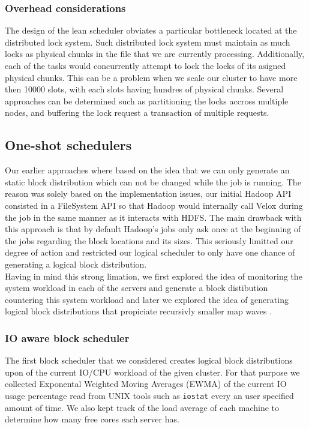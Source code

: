 \subsubsection{Overhead considerations}
The design of the lean scheduler obviates a particular bottleneck located at the distributed lock system. Such distributed lock system must maintain as much locks as physical chunks in the file that 
we are currently processing. Additionally, each of the tasks would concurrently attempt to lock the locks of its asigned physical chunks. This can be a problem when we scale our cluster to have more then 10000 slots, with each slots having hundres of physical chunks. Several approaches can be determined such as partitioning the locks accross multiple nodes, and buffering the lock request a transaction of multiple requests.  

\subsection{One-shot schedulers}
Our earlier approaches where based on the idea that we can only generate an static block distribution which can not be changed while the job is running.  The reason was solely based on the implementation issues, our initial Hadoop API consisted in a FileSystem API so that Hadoop would internally call Velox during the job in the same manner as it interacts with HDFS. The main drawback with this approach is that by default Hadoop's jobs only ask once at the beginning of the jobs regarding the block locations and its sizes. This seriously limitted our degree of action and restricted our logical scheduler to only have one chance of generating a logical block distribution. \\

Having in mind this strong limation, we first explored the idea of monitoring the system workload in each of the servers and generate a block distibution countering this system workload and later we explored the idea of generating logical block distributions that propiciate recursivly smaller map waves .


\subsubsection{IO aware block scheduler}
The first block scheduler that we considered creates logical block distributions upon of the current IO/CPU workload of the given cluster. For that purpose we collected Exponental Weighted Moving Averages (EWMA) of the current IO usage percentage read from UNIX tools such as \texttt{iostat} every an user specified amount of time. We also kept track of the load average of each machine to determine how many free cores each server has.

